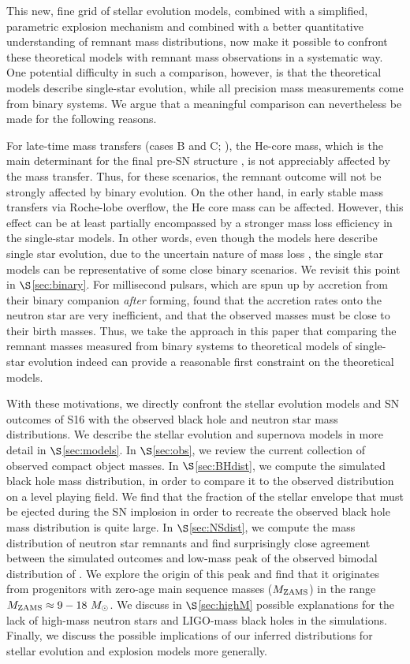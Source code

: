\documentclass[]{emulateapj}
\newcommand{\Ms}{M_{\odot}}
\newcommand{\Mz}{M_{\rm ZAMS}}
\begin{document}
This new, fine grid of stellar evolution models, combined with a simplified, parametric explosion mechanism and combined with a better quantitative understanding of remnant mass distributions, now make it possible to confront these theoretical models with remnant mass observations in a systematic way. One potential difficulty in such a comparison, however, is that the theoretical models describe single-star evolution, while all precision mass measurements come from binary systems. We argue that a meaningful comparison can nevertheless be made for the following reasons. 

For late-time mass transfers (cases B and C; \citealt{Smith2014}), the He-core mass, which is the main determinant for the final pre-SN structure \citep{Sukhbold2014}, is not appreciably affected by the mass transfer. Thus, for these scenarios, the remnant outcome will not be strongly affected by  binary evolution. On the other hand, in early stable mass transfers via Roche-lobe overflow, the He core mass can be affected. However, this effect can be at least partially encompassed by a stronger mass loss efficiency in the single-star models. In other words, even though the models here describe single star evolution, due to the uncertain nature of mass loss \citep[e.g.,][]{Renzo2017}, the single star models can be representative of some close binary scenarios. We revisit this point in $\S$\ref{sec:binary}.
For millisecond pulsars, which are spun up by accretion from their binary companion \textit{after} forming, \citet{Antoniadis2016} found that the accretion rates onto the neutron star are very inefficient, and that the observed masses must be close to their birth masses. Thus, we take the approach in this paper that comparing the remnant masses measured from binary systems to theoretical models of single-star evolution indeed can provide a reasonable first constraint on the theoretical models.

With these motivations, we directly confront the stellar evolution models and SN outcomes of S16 with the observed black hole and neutron star mass distributions. We describe the stellar evolution and supernova models in more detail in $\S$\ref{sec:models}. In $\S$\ref{sec:obs}, we review the current collection of observed compact object masses. In $\S$\ref{sec:BHdist}, we compute the simulated black hole mass distribution, in order to compare it to the observed distribution on a level playing field. We find that the fraction of the stellar envelope that must be ejected during the SN implosion in order to recreate the observed black hole mass distribution is quite large. In $\S$\ref{sec:NSdist}, we compute the mass distribution of neutron star remnants and find surprisingly close agreement between the simulated outcomes and low-mass peak of the observed bimodal distribution of \citet{Antoniadis2016}. We explore the origin of this peak and find that it originates from progenitors with zero-age main sequence masses ($\Mz$) in the range $\Mz \approx 9-18~\Ms$. We discuss in $\S$\ref{sec:highM} possible explanations for the lack of high-mass neutron stars and LIGO-mass black holes in the simulations. Finally, we discuss the possible implications of our inferred distributions for stellar evolution and explosion models more generally.
\end{document}

